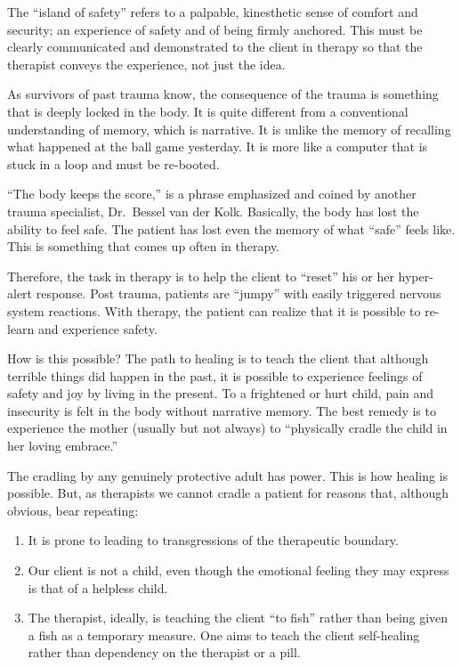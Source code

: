 \documentclass[]{book}
\begin{document}
The ``island of safety'' refers to a palpable, kinesthetic sense of comfort and security; an experience of safety and of being firmly anchored. This must be clearly communicated and demonstrated to the client in therapy so that the therapist conveys the experience, not just the idea.

As survivors of past trauma know, the consequence of the trauma is something that is deeply locked in the body. It is quite different from a conventional understanding of memory, which is narrative. It is unlike the memory of recalling what happened at the ball game yesterday. It is more like a computer that is stuck in a loop and must be re-booted.

``The body keeps the score,'' is a phrase emphasized and coined by another trauma specialist, Dr.~Bessel van der Kolk. Basically, the body has lost the ability to feel safe. The patient has lost even the memory of what ``safe'' feels like. This is something that comes up often in therapy.

Therefore, the task in therapy is to help the client to ``reset'' his or her hyper-alert response. Post trauma, patients are ``jumpy'' with easily triggered nervous system reactions. With therapy, the patient can realize that it is possible to re-learn and experience safety.

How is this possible? The path to healing is to teach the client that although terrible things did happen in the past, it is possible to experience feelings of safety and joy by living in the present. To a frightened or hurt child, pain and insecurity is felt in the body without narrative memory. The best remedy is to experience the mother (usually but not always) to ``physically cradle the child in her loving embrace.''

The cradling by any genuinely protective adult has power. This is how healing is possible. But, as therapists we cannot cradle a patient for reasons that, although obvious, bear repeating:

\begin{enumerate}
\def\labelenumi{\arabic{enumi}.}
\item
  It is prone to leading to transgressions of the therapeutic boundary.
\item
  Our client is not a child, even though the emotional feeling they may express is that of a helpless child.
\item
  The therapist, ideally, is teaching the client ``to fish'' rather than being given a fish as a temporary measure. One aims to teach the client self-healing rather than dependency on the therapist or a pill.
\end{enumerate}
\end{document}
